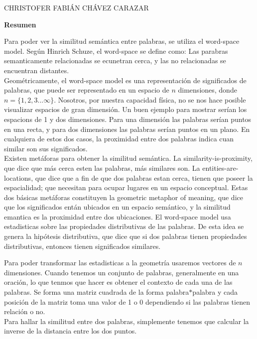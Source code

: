 \documentclass[a4paper,12pt]{article}
\begin{document}
  \begin{LARGE}
   CHRISTOFER FABIÁN CHÁVEZ CARAZAR
  \end{LARGE}
  
  \begin{Large}
   \textbf{Resumen}
  \end{Large}

  Para poder ver la similitud semántica entre palabras, se utiliza el word-space model.
  Según Hinrich Schuze, el word-space se define como: Las parabras semanticamente relacionadas se
  ecunetran cerca, y las no relacionadas se encuentran distantes. \\
  Geométricamente, el word-space model es una representación de significados de palabras, que puede ser
  representado en un espacio de $n$ dimensiones, donde $n = \{1,2,3...\infty \}$. Nosotros, por nuestra capacidad física,
  no se nos hace posible visualizar espacios de gran dimensión. Un buen ejemplo para mostrar serían los espacions de 1
  y dos dimensiones. Para una dimensión las palabras serían puntos en una recta, y para dos dimensiones las palabras serían
  puntos en un plano. En cualquiera de estos dos casos, la proximidad entre dos palabras indica cuan similar son sus
  significados. \\
  Existen metáforas para obtener la similitud semántica. La similarity-is-proximity, que dice que más cerca esten las palabras,
  más similares son. La entities-are-locations, que dice que a fin de que dos palabras estan cerca, tienen que poseer la espacialidad;
  que necesitan para ocupar lugares en un espacio conceptual. Estas dos básicas metáforas constituyen la geometric metaphor of meaning,
  que dice que los significados entán ubicados en un espacio semántico, y la similitud emantica es la proximidad entre dos ubicaciones.
  El word-space model usa estadisticas sobre las propiedades distributivas de las palabras. De esta idea se genera la hipótesis
  distributiva, que dice que si dos palabras tienen propiedades distributivas, entonces tienen significados similares. \par
  Para poder transformar las estadisticas a la geometría usaremos vectores de $n$ dimensiones. Cuando tenemos un conjunto de palabras,
  generalmente en una oración, lo que tenmos que hacer es obtener el contexto de cada una de las palabras. Se forma una matriz cuadrada
  de la forma palabra$*$palabra y cada posición de la matriz toma una valor de 1 o 0 dependiendo si las palabras tienen relación o no. \\
  Para hallar la similitud entre dos palabras, simplemente tenemos que calcular la inverse de la distancia entre los dos puntos.
\end{document}

